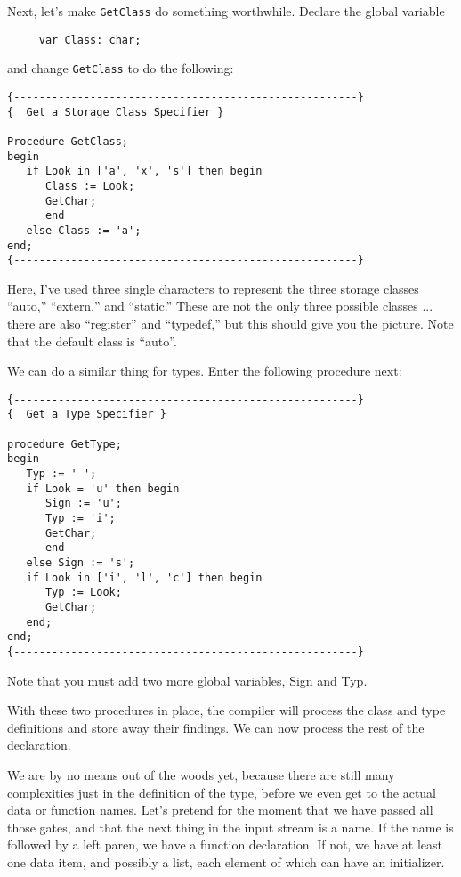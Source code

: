 Next, let's make  {\tt GetClass}  do something worthwhile. Declare the global variable

\begin{verbatim}
     var Class: char;
\end{verbatim}

and change {\tt GetClass} to do the following:

\begin{verbatim}
{------------------------------------------------------}
{  Get a Storage Class Specifier }

Procedure GetClass;
begin
   if Look in ['a', 'x', 's'] then begin
      Class := Look;
      GetChar;
      end
   else Class := 'a';
end;
{------------------------------------------------------}
\end{verbatim}

Here, I've used three  single  characters  to represent the three storage classes ``auto,'' ``extern,''  and  ``static.''   These are not the only three possible classes ... there are also ``register'' and ``typedef,'' but this should  give  you the picture. Note that the default class is ``auto''.

We  can  do  a  similar  thing  for  types. Enter the following procedure next:

\begin{verbatim}
{------------------------------------------------------}
{  Get a Type Specifier }

procedure GetType;
begin
   Typ := ' ';
   if Look = 'u' then begin
      Sign := 'u';
      Typ := 'i';
      GetChar;
      end
   else Sign := 's';
   if Look in ['i', 'l', 'c'] then begin
      Typ := Look;
      GetChar;
   end;
end;
{------------------------------------------------------}
\end{verbatim}

Note that you must add two more global variables, Sign and Typ.

With these two procedures in place, the compiler will process the class and type definitions and store away their findings. We can now process the rest of the declaration.

We  are by no means out of the woods yet, because there are still many complexities just in the definition of the  type, before we even get to the actual data or function names. Let's pretend for the moment that we have passed all those gates, and that the next thing in the  input stream is a name. If the name is followed by a left paren, we have a function declaration. If not, we have at least one data item, and  possibly a list, each element of which can have an initializer.

